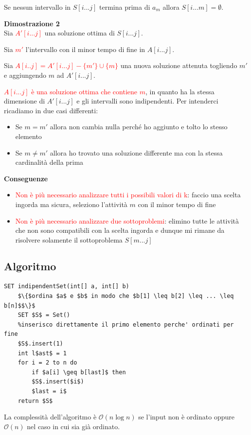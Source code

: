 \documentclass[../cheatSheetAlgoritmi.tex]{subfiles}
\begin{document}
Se nessun intervallo in $S[i...j]$ termina prima di $a_m$ allora $S[i...m] = \emptyset$.

\bigskip

\textbf{Dimostrazione 2}\\
Sia \textcolor{red}{$A'[i...j]$} una soluzione ottima di $S[i...j]$.

Sia \textcolor{red}{$m'$} l'intervallo con il minor tempo di fine in $A[i...j]$.

Sia \textcolor{red}{$A[i..j] = A'[i...j] - \{ m' \} \cup \{ m \}$} una nuova soluzione attenuta togliendo $m'$ e aggiungendo $m$ ad $A'[i...j]$.

\textcolor{red}{$A[i...j]$ è una soluzione ottima che contiene $m$}, in quanto ha la stessa dimensione di $A'[i...j]$ e gli intervalli sono indipendenti. Per intenderci ricadiamo in due casi differenti:
\begin{itemize}
	\item Se $m = m'$ allora non cambia nulla perché ho aggiunto e tolto lo stesso elemento
	\item Se $m \neq m'$ allora ho trovato una soluzione differente ma con la stessa cardinalità della prima 
\end{itemize}
\textbf{Conseguenze}

\begin{itemize}
	\item \textcolor{red}{Non è più necessario analizzare tutti i possibili valori di k}: faccio una scelta ingorda ma sicura, seleziono l'attività $m$ con il minor tempo di fine
	\item \textcolor{red}{Non è più necessario analizzare due sottoproblemi}: elimino tutte le attività che non sono compatibili con la scelta ingorda e dunque mi rimane da risolvere solamente il sottoproblema $S[m...j]$
\end{itemize}
\subsection{Algoritmo}
\begin{lstlisting}[caption=indipendent Set (Greedy)]
SET indipendentSet(int[] a, int[] b)
	$\{$ordina $a$ e $b$ in modo che $b[1] \leq b[2] \leq ... \leq b[n]$$\}$
	SET $S$ = Set()
	%inserisco direttamente il primo elemento perche' ordinati per fine
	$S$.insert(1) 
	int l$ast$ = 1
	for i = 2 to n do
		if $a[i] \geq b[last]$ then
		$S$.insert($i$)
		$last = i$
	return $S$
\end{lstlisting}
La complessità dell'algoritmo è $\mathcal{O}(n\log{n})$ se l'input non è ordinato oppure $\mathcal{O}(n)$ nel caso in cui sia già ordinato.
\end{document}
